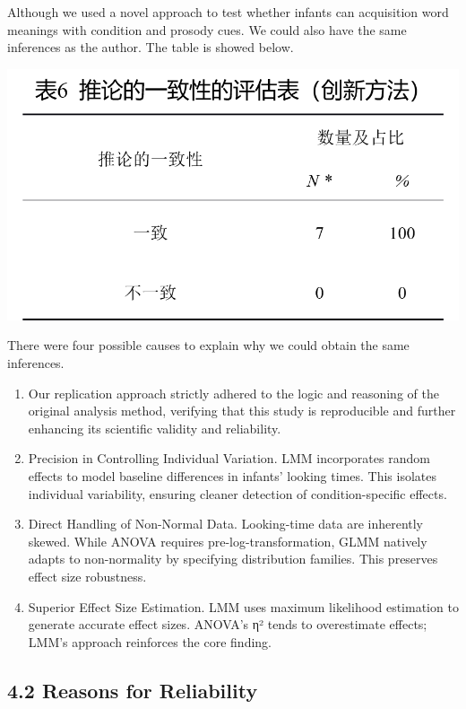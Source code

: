 \documentclass[
  man]{apa6}
\begin{document}
Although we used a novel approach to test whether infants can acquisition word meanings with condition and prosody cues. We could also have the same inferences as the author. The table is showed below.

\includegraphics{pic/table_6.png}

There were four possible causes to explain why we could obtain the same inferences.

\begin{enumerate}
\def\labelenumi{(\arabic{enumi})}
\item
  Our replication approach strictly adhered to the logic and reasoning of the original analysis method, verifying that this study is reproducible and further enhancing its scientific validity and reliability.
\item
  Precision in Controlling Individual Variation. LMM incorporates random effects to model baseline differences in infants' looking times. This isolates individual variability, ensuring cleaner detection of condition-specific effects.
\item
  Direct Handling of Non-Normal Data. Looking-time data are inherently skewed. While ANOVA requires pre-log-transformation, GLMM natively adapts to non-normality by specifying distribution families. This preserves effect size robustness.
\item
  Superior Effect Size Estimation. LMM uses maximum likelihood estimation to generate accurate effect sizes. ANOVA's η² tends to overestimate effects; LMM's approach reinforces the core finding.
\end{enumerate}

\subsection{4.2 Reasons for Reliability}\label{reasons-for-reliability}
\end{document}

